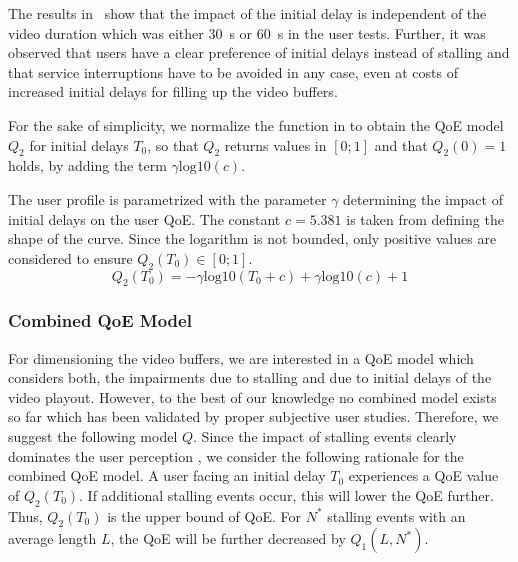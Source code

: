 The results in~\cite{Hossfeld2012c} show that the impact of the initial delay is independent of the video duration which was either \SI{30}{\second} or \SI{60}{\second} in the user tests.
Further, it was observed that users have a clear preference of initial delays instead
of stalling and that service interruptions have to be avoided in any case, even at costs of increased initial delays for filling up the video buffers. 

For the sake of simplicity, we normalize the function in  to obtain the \gls{QoE} model \(Q_2\) for initial delays \(T_0\), so that \(Q_2\) returns values in \(\left[0;1\right]\) and that \(Q_2(0)=1\) holds, by adding the term \(\gamma \mathrm{log10}\left(c\right)\).

The user profile is parametrized with the parameter \(\gamma\) determining the impact of initial delays on the user \gls{QoE}.
The constant \(c=5.381\) is taken from  defining the shape of the curve. 
Since the logarithm is not bounded, only positive values are considered to ensure \(Q_2(T_0) \in [0;1]\).
\begin{equation*}
Q_2(T_0)= -\gamma \mathrm{log10}\left(T_0 + c\right) + \gamma \mathrm{log10}\left(c\right)+ 1 
\end{equation*}

\subsubsection*{Combined QoE Model}\label{sec:application:qoe_user_behaviour:typical_user_scenarios:youtube_qoe:combined}
For dimensioning the video buffers, we are interested in a \gls{QoE} model which considers both, the impairments due to stalling and due to initial delays of the video playout.
However, to the best of our knowledge no combined model exists so far which has been validated by proper subjective user studies.
Therefore, we suggest the following model \(Q\).
Since the impact of stalling events clearly dominates the user perception \cite{Hossfeld2012a,Hossfeld2012c}, we consider the following rationale for the combined QoE model.
A user facing an initial delay \(T_0\) experiences a \gls{QoE} value of \(Q_2(T_0)\).
If additional stalling events occur, this will lower the QoE further.
Thus, \(Q_2(T_0)\) is the upper bound of \gls{QoE}.
For \(N^*\) stalling events with an average length \(L\), the \gls{QoE} will be further decreased by \(Q_1(L,N^*)\).

